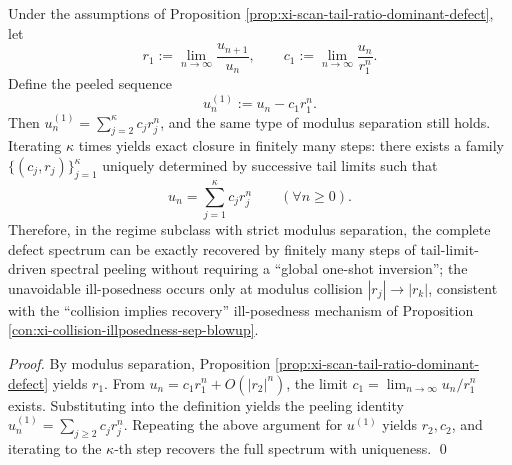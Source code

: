 \begin{proposition}\label{prop:xi-scan-successive-peeling-closure}
Under the assumptions of Proposition \ref{prop:xi-scan-tail-ratio-dominant-defect}, let
\[
r_1:=\lim_{n\to\infty}\frac{u_{n+1}}{u_n},
\qquad
c_1:=\lim_{n\to\infty}\frac{u_{n}}{r_1^{n}}.
\]
Define the peeled sequence
\[
u_n^{(1)}:=u_n-c_1r_1^n.
\]
Then \(u_n^{(1)}=\sum_{j=2}^{\kappa}c_jr_j^n\), and the same type of modulus separation still holds.
Iterating \(\kappa\) times yields exact closure in finitely many steps: there exists a family \(\{(c_j,r_j)\}_{j=1}^{\kappa}\) uniquely determined by successive tail limits such that
\[
u_n=\sum_{j=1}^{\kappa}c_jr_j^n\qquad(\forall n\ge 0).
\]
Therefore, in the regime subclass with strict modulus separation, the complete defect spectrum can be exactly recovered by finitely many steps of tail-limit-driven spectral peeling without requiring a ``global one-shot inversion''; the unavoidable ill-posedness occurs only at modulus collision \(|r_j|\to|r_k|\), consistent with the ``collision implies recovery'' ill-posedness mechanism of Proposition \ref{con:xi-collision-illposedness-sep-blowup}.
\end{proposition}
\begin{proof}
By modulus separation, Proposition \ref{prop:xi-scan-tail-ratio-dominant-defect} yields \(r_1\).
From \(u_n=c_1r_1^n+O(|r_2|^n)\), the limit \(c_1=\lim_{n\to\infty}u_n/r_1^n\) exists.
Substituting into the definition yields the peeling identity \(u_n^{(1)}=\sum_{j\ge 2}c_jr_j^n\).
Repeating the above argument for \(u^{(1)}\) yields \(r_2,c_2\), and iterating to the \(\kappa\)-th step recovers the full spectrum with uniqueness. \qed
\end{proof}

\endinput
